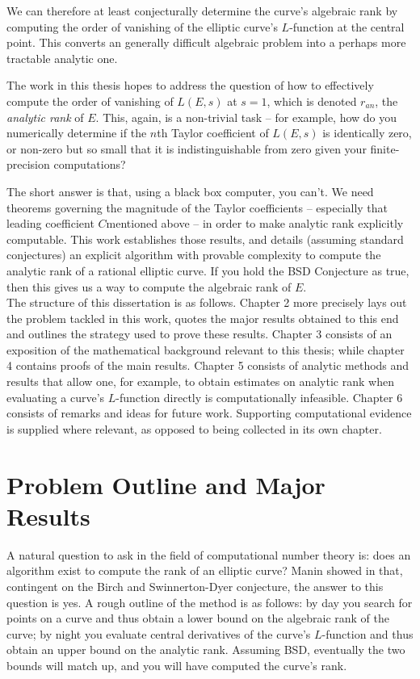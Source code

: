 \documentclass[10pt]{article}
\begin{document}
We can therefore at least conjecturally determine the curve's algebraic rank by computing the order of vanishing of the elliptic curve's $L$-function at the central point. This converts an generally difficult algebraic problem into a perhaps more tractable analytic one.

The work in this thesis hopes to address the question of how to effectively compute the order of vanishing of $L(E,s)$ at $s=1$, which is denoted $r_{an}$, the {\it analytic rank} of $E$. This, again, is a non-trivial task -- for example, how do you numerically determine if the $n$th Taylor coefficient of $L(E,s)$ is identically zero, or non-zero but so small that it is indistinguishable from zero given your finite-precision computations?

The short answer is that, using a black box computer, you can't. We need theorems governing the magnitude of the Taylor coefficients -- especially that leading coefficient $C$mentioned above -- in order to make analytic rank explicitly computable. This work establishes those results, and details (assuming standard conjectures) an explicit algorithm with provable complexity to compute the analytic rank of a rational elliptic curve. If you hold the BSD Conjecture as true, then this gives us a way to compute the algebraic rank of $E$. \\

The structure of this dissertation is as follows. Chapter 2 more precisely lays out the problem tackled in this work, quotes the major results obtained to this end and outlines the strategy used to prove these results. Chapter 3 consists of an exposition of the mathematical background relevant to this thesis; while chapter 4 contains proofs of the main results. Chapter 5 consists of analytic methods and results that allow one, for example, to obtain estimates on analytic rank when evaluating a curve's $L$-function directly is computationally infeasible. Chapter 6 consists of remarks and ideas for future work. Supporting computational evidence is supplied where relevant, as opposed to being collected in its own chapter.

\newpage
\section{Problem Outline and Major Results}\label{sec:outline_results}

A natural question to ask in the field of computational number theory is: does an algorithm exist to compute the rank of an elliptic curve? Manin showed in \cite{Man-1971} that, contingent on the Birch and Swinnerton-Dyer conjecture, the answer to this question is yes. A rough outline of the method is as follows: by day you search for points on a curve and thus obtain a lower bound on the algebraic rank of the curve; by night you evaluate central derivatives of the curve's $L$-function and thus obtain an upper bound on the analytic rank. Assuming BSD, eventually the two bounds will match up, and you will have computed the curve's rank.
\end{document}
